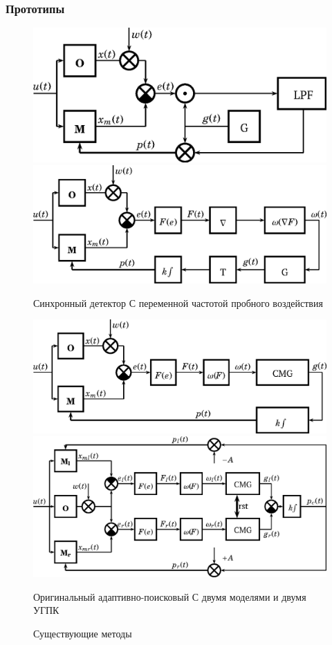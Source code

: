 \documentclass[10pt,utf8]{beamer}
\newlength\TW
\begin{document}
\begin{frame}
  \frametitle{Прототипы}

  \begin{figure}[h!]
    \centerline{
      \includegraphics[width=45\TW]{p/oldsch/sd1.png}
      \hfill
      \includegraphics[width=45\TW]{p/oldsch/vsf1.png}
    }
    \centerline{
      {Синхронный детектор}
      \hfill
      {С переменной частотой пробного воздействия}
    }
    \centerline{
      \includegraphics[width=45\TW]{p/oldsch/api1.png}
      \hfill
      \includegraphics[width=45\TW]{p/oldsch/bimod.png}
    }
    \centerline{
      {Оригинальный адаптивно-поисковый}
      \hfill
      {С  двумя моделями и двумя УГПК}
    }
    \label{atu:f:oldsch}
    \caption{Существующие методы}
  \end{figure}



\end{frame}
\end{document}
